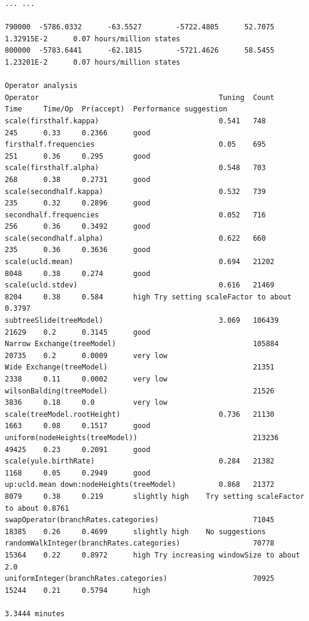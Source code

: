 \documentclass[12pt]{article}
\begin{document}
{\begin{verbatim}
... ...

790000	-5786.0332  	-63.5527    	-5722.4805  	52.7075     	1.32915E-2  	0.07 hours/million states
800000	-5783.6441  	-62.1815    	-5721.4626  	58.5455     	1.23201E-2  	0.07 hours/million states

Operator analysis
Operator                                          Tuning  Count      Time     Time/Op  Pr(accept)  Performance suggestion
scale(firsthalf.kappa)                            0.541   748        245      0.33     0.2366      good	
firsthalf.frequencies                             0.05    695        251      0.36     0.295       good	
scale(firsthalf.alpha)                            0.548   703        268      0.38     0.2731      good	
scale(secondhalf.kappa)                           0.532   739        235      0.32     0.2896      good	
secondhalf.frequencies                            0.052   716        256      0.36     0.3492      good	
scale(secondhalf.alpha)                           0.622   660        235      0.36     0.3636      good	
scale(ucld.mean)                                  0.694   21202      8048     0.38     0.274       good	
scale(ucld.stdev)                                 0.616   21469      8204     0.38     0.584       high	Try setting scaleFactor to about 0.3797
subtreeSlide(treeModel)                           3.069   106439     21629    0.2      0.3145      good	
Narrow Exchange(treeModel)                                105884     20735    0.2      0.0009      very low	
Wide Exchange(treeModel)                                  21351      2338     0.11     0.0002      very low	
wilsonBalding(treeModel)                                  21526      3836     0.18     0.0         very low	
scale(treeModel.rootHeight)                       0.736   21130      1663     0.08     0.1517      good	
uniform(nodeHeights(treeModel))                           213236     49425    0.23     0.2091      good	
scale(yule.birthRate)                             0.284   21382      1168     0.05     0.2949      good	
up:ucld.mean down:nodeHeights(treeModel)          0.868   21372      8079     0.38     0.219       slightly high	Try setting scaleFactor to about 0.8761
swapOperator(branchRates.categories)                      71045      18385    0.26     0.4699      slightly high	No suggestions
randomWalkInteger(branchRates.categories)                 70778      15364    0.22     0.8972      high	Try increasing windowSize to about 2.0
uniformInteger(branchRates.categories)                    70925      15244    0.21     0.5794      high	

3.3444 minutes 
\end{verbatim}}
\end{document}
